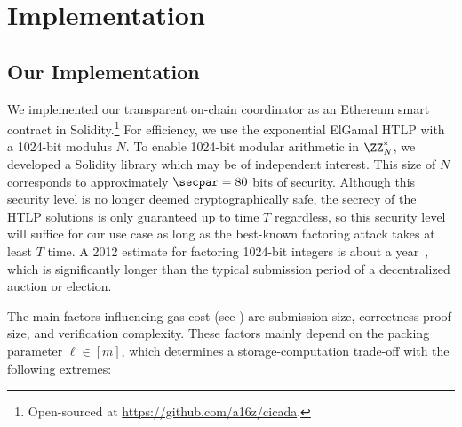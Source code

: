 \section{Implementation}\label{sec:cicada_eval} 



\subsection{Our Implementation}\label{sec:implementation}

We implemented our transparent on-chain coordinator as an Ethereum smart contract in Solidity.\footnote{Open-sourced at \url{https://github.com/a16z/cicada}.} 
For efficiency, we use the exponential ElGamal HTLP with a 1024-bit modulus $N$.
To enable 1024-bit modular arithmetic in $\ZZ_N^*$, we developed a Solidity library which may be of independent interest. 
This size of $N$ corresponds to approximately $\secpar=80$ bits of security.
Although this security level is no longer deemed cryptographically safe, the secrecy of the HTLP solutions is only guaranteed up to time $T$ regardless, so this security level will suffice for our use case as long as the best-known factoring attack takes at least $T$ time. A 2012 estimate for factoring 1024-bit integers is about a year~\cite{facthacks}, which is significantly longer than the typical submission period of a decentralized auction or election.

The main factors influencing gas cost (see ) are submission size, correctness proof size, and verification complexity. These factors mainly depend on the packing parameter $\ell\in[m]$, which determines a storage-computation trade-off with the following extremes:

